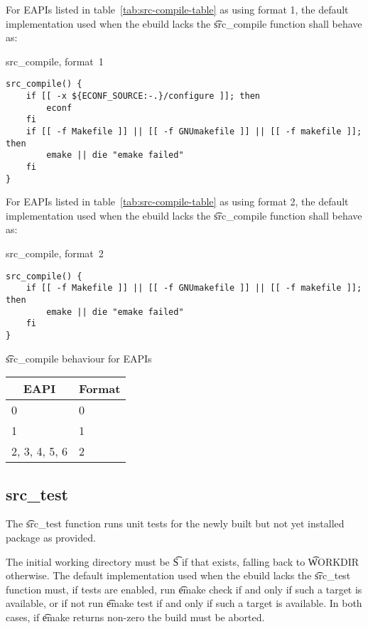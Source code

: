  For EAPIs listed in table~\ref{tab:src-compile-table} as using format
1, the default implementation used when the ebuild lacks the \t{src\_compile} function shall behave
as:

\begin{listing}[H]
\caption{src\_compile, format~1}
\begin{verbatim}
src_compile() {
    if [[ -x ${ECONF_SOURCE:-.}/configure ]]; then
        econf
    fi
    if [[ -f Makefile ]] || [[ -f GNUmakefile ]] || [[ -f makefile ]]; then
        emake || die "emake failed"
    fi
}
\end{verbatim}
\end{listing}

 For EAPIs listed in table~\ref{tab:src-compile-table} as using format
2, the default implementation used when the ebuild lacks the \t{src\_compile} function shall behave
as:

\begin{listing}[H]
\caption{src\_compile, format~2}
\begin{verbatim}
src_compile() {
    if [[ -f Makefile ]] || [[ -f GNUmakefile ]] || [[ -f makefile ]]; then
        emake || die "emake failed"
    fi
}
\end{verbatim}
\end{listing}

\begin{centertable}{\t{src\_compile} behaviour for EAPIs}
    \label{tab:src-compile-table}
    \begin{tabular}{ll}
      \toprule
      \multicolumn{1}{c}{\textbf{EAPI}} &
      \multicolumn{1}{c}{\textbf{Format}} \\
      \midrule
      0                 & 0 \\
      1                 & 1 \\
      2, 3, 4, 5, 6     & 2 \\
      \bottomrule
    \end{tabular}
\end{centertable}

\subsection{src\_test}

The \t{src\_test} function runs unit tests for the newly built but not yet installed package as
provided.

The initial working directory must be \t{S} if that exists, falling back to \t{WORKDIR} otherwise.
The default implementation used when the ebuild lacks the \t{src\_test} function must, if tests are
enabled, run \t{emake check} if and only if such a target is available, or if not run
\t{emake test} if and only if such a target is available. In both cases, if \t{emake} returns
non-zero the build must be aborted.

